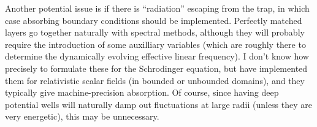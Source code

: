 \documentclass{revtex4}
\begin{document}
Another potential issue is if there is ``radiation'' escaping from the trap, in which case absorbing boundary conditions should be implemented.  Perfectly matched layers go together naturally with spectral methods, although they will probably require the introduction of some auxilliary variables (which are roughly there to determine the dynamically evolving effective linear frequency).  I don't know how precisely to formulate these for the Schrodinger equation, but have implemented them for relativistic scalar fields (in bounded or unbounded domains), and they typically give machine-precision absorption.  Of course, since having deep potential wells will naturally damp out fluctuations at large radii (unless they are very energetic), this may be unnecessary.
\end{document}
